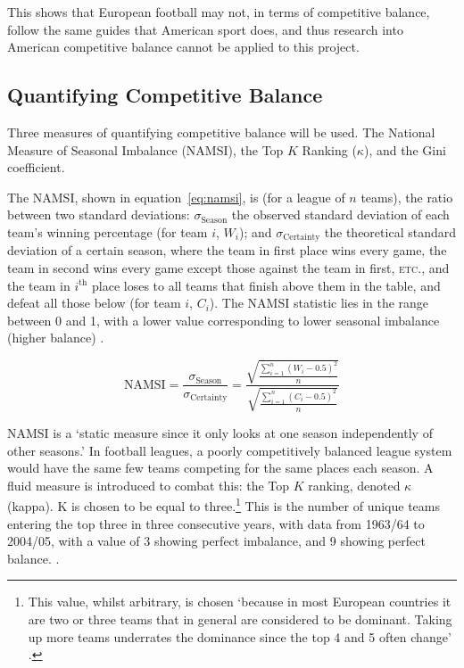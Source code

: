 \documentclass[a4paper,10pt]{report}
\begin{document}
This shows that European football may not, in terms of competitive balance, follow the same guides that American sport does, and thus research into American competitive balance cannot be applied to this project.

\subsection{Quantifying Competitive Balance}
Three measures of quantifying competitive balance will be used. The National Measure of Seasonal Imbalance (NAMSI), the Top $K$ Ranking ($\kappa$), and the Gini coefficient.

The NAMSI, shown in equation~\ref{eq:namsi}, is (for a league of $n$ teams), the ratio between two standard deviations: $\sigma_{\textrm{Season}}$ the observed standard deviation of each team's winning percentage (for team $i$, $W_i$); and $\sigma_{\textrm{Certainty}}$ the theoretical standard deviation of a certain season, where the team in first place wins every game, the team in second wins every game except those against the team in first, \textsc{etc.}, and the team in $i^{\textrm{th}}$ place loses to all teams that finish above them in the table, and defeat all those below (for team $i$, $C_i$). The NAMSI statistic lies in the range between 0 and 1, with a lower value corresponding to lower seasonal imbalance (higher balance) \autocite{Goossens05}.

\begin{equation}\label{eq:namsi}
\textrm{NAMSI} = \frac{\sigma_{\textrm{Season}}}{\sigma_{\textrm{Certainty}}} = \displaystyle{
	\frac{\sqrt{ \displaystyle{ \frac{\sum^n_{i=1} (W_i - 0.5)^2 } {n} }}}
	{\sqrt{ \displaystyle{\frac{\sum^n_{i=1} (C_i - 0.5)^2 } {n} } }}}
\end{equation}

NAMSI is a `static measure since it only looks at one season independently of other seasons.' In football leagues, a poorly competitively balanced league system would have the same few teams competing for the same places each season. A fluid measure is introduced to combat this: the Top $K$ ranking, denoted $\kappa$ (kappa). K is chosen to be equal to three.\footnote{This value, whilst arbitrary, is chosen `because in most European countries it are two or three teams that in general are considered to be dominant. Taking up more teams underrates the dominance since the top 4 and 5 often change' \autocite{Goossens05}.} This is the number of unique teams entering the top three in three consecutive years, with data from 1963/64 to 2004/05, with a value of 3 showing perfect imbalance, and 9 showing perfect balance. \autocite{Goossens05}.
\end{document}
